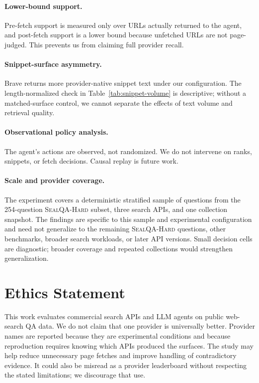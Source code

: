 \paragraph{Lower-bound support.}
Pre-fetch support is measured only over URLs actually returned to the agent, and post-fetch support is a lower bound because unfetched URLs are not page-judged. This prevents us from claiming full provider recall.

\paragraph{Snippet-surface asymmetry.}
Brave returns more provider-native snippet text under our configuration. The length-normalized check in Table~\ref{tab:snippet-volume} is descriptive; without a matched-surface control, we cannot separate the effects of text volume and retrieval quality.

\paragraph{Observational policy analysis.}
The agent's actions are observed, not randomized. We do not intervene on ranks, snippets, or fetch decisions. Causal replay is future work.

\paragraph{Scale and provider coverage.}
The experiment covers a deterministic stratified sample of \NQueries{} questions from the 254-question \textsc{SealQA-Hard} subset, three search APIs, and one collection snapshot. The findings are specific to this sample and experimental configuration and need not generalize to the remaining \textsc{SealQA-Hard} questions, other benchmarks, broader search workloads, or later API versions. Small decision cells are diagnostic; broader coverage and repeated collections would strengthen generalization.

\section*{Ethics Statement}
This work evaluates commercial search APIs and LLM agents on public web-search QA data. We do not claim that one provider is universally better. Provider names are reported because they are experimental conditions and because reproduction requires knowing which APIs produced the surfaces. The study may help reduce unnecessary page fetches and improve handling of contradictory evidence. It could also be misread as a provider leaderboard without respecting the stated limitations; we discourage that use.

